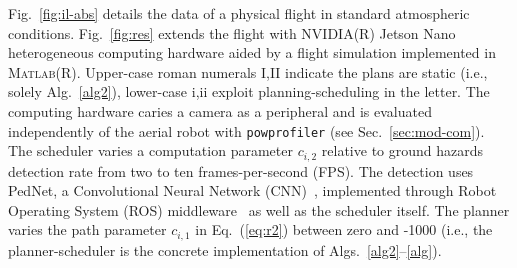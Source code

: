 \documentclass[letterpaper,10pt,journal,twoside]{IEEEtran}
\newcommand{\stt}[1]{{\small\tt #1}} %
\newcommand{\powprof}{\stt{powprofiler}}
\theoremstyle{definition}
\begin{document}
Fig.~\ref{fig:il-abs} details the data of a physical flight  
in standard atmospheric conditions. 
Fig.~\ref{fig:res} extends the flight with NVIDIA\hspace{.5ex}(R) Jetson Nano heterogeneous computing hardware aided by a flight simulation implemented in \textsc{Matlab}\hspace{.5ex}(R). 
Upper-case roman numerals I,II indicate the plans are static (i.e., solely Alg.~\ref{alg2}), lower-case i,ii exploit planning-scheduling in the letter.
The computing hardware caries a camera as a peripheral and is evaluated independently of the aerial robot with \powprof{} (see Sec.~\ref{sec:mod-com}). The scheduler varies a computation parameter $c_{i,2}$ relative to ground hazards detection rate from two to ten frames-per-second (FPS). The detection uses PedNet, a Convolutional Neural Network (CNN)~\cite{ullah2018pednet}, implemented through Robot Operating System (ROS) middleware~\cite{quigley2009ros} as well as the scheduler itself. The planner varies the path parameter $c_{i,1}$ in Eq.~(\ref{eq:r2}) between zero and -1000 (i.e., the planner-scheduler is the concrete implementation of Algs.~\ref{alg2}--\ref{alg}).


\end{document}
